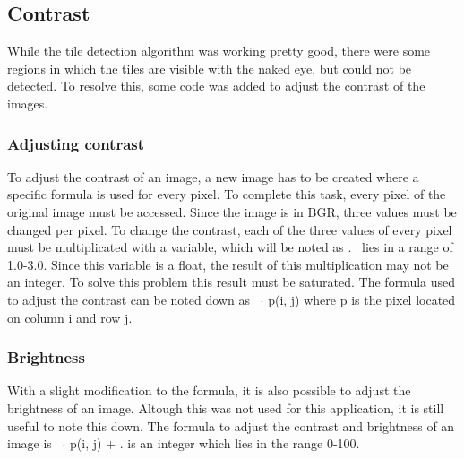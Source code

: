 \subsection{Contrast}

While the tile detection algorithm was working pretty good, there were some regions in which the tiles are visible with the naked eye, but could not be detected. To resolve this, some code was added to adjust the contrast of the images. 

\subsubsection{Adjusting contrast}

To adjust the contrast of an image, a new image has to be created where a specific formula is used for every pixel. To complete this task, every pixel of the original image must be accessed. Since the image is in BGR, three values must be changed per pixel. To change the contrast, each of the three values of every pixel must be multiplicated with a variable, which will be noted as \textalpha. \textalpha  \ lies in a range of 1.0-3.0. Since this variable is a float, the result of this multiplication may not be an integer. To solve this problem this result must be saturated. The formula used to adjust the contrast can be noted down as \textalpha \  $ \cdot $ p(i, j) where p is the pixel located on column i and row j.

\subsubsection{Brightness}

With a slight modification to the formula, it is also possible to adjust the brightness of an image. Altough this was not used for this application, it is still useful to note this down. The formula to adjust the contrast and brightness of an image is \textalpha \  $ \cdot $ p(i, j) + \textbeta. \textbeta is an integer which lies in the range 0-100.